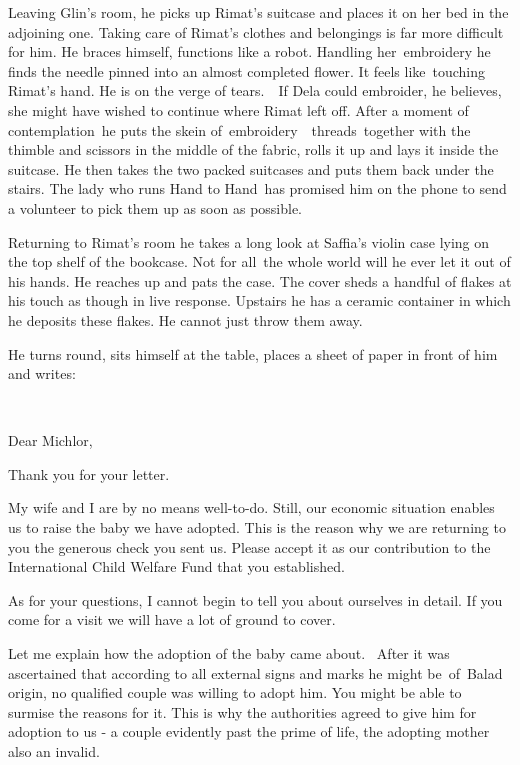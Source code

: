\documentclass[letterpaper]{article}
\begin{document}
Leaving Glin's room, he picks up Rimat's suitcase and places it on her bed in the adjoining one. Taking care of Rimat's
clothes and belongings is far more difficult for him. He braces himself, functions like a robot. Handling
her\ embroidery he finds the needle pinned into an almost completed flower. It feels like~touching Rimat's hand. He is
on the verge of tears\textcolor[rgb]{0.0,0.4392157,0.7529412}{.}\ \ If Dela could embroider, he believes, she might
have wished to continue where Rimat left off. After a moment of contemplation\ he puts the skein
of\ embroidery\ \ threads\ together with the thimble and scissors in the middle of the fabric, rolls it up and lays it
inside the suitcase. He then takes the two packed suitcases and puts them back under the stairs. The lady who runs
{\textquotedbl}Hand to Hand{\textquotedbl}~has promised him on the phone to send a volunteer to pick them up as soon as
possible. 

Returning to Rimat's room he takes a long look at Saffia's violin case lying on the top shelf of the bookcase. Not for
all\textcolor[rgb]{0.0,0.4392157,0.7529412}{\ }the whole world will he ever let it out of his hands. He reaches up and
pats the case. The cover sheds a handful of flakes at his touch as though in live response. Upstairs he has a ceramic
container in which he deposits these flakes. He cannot just throw them away.

He turns round, sits himself at the table, places a sheet of paper in front of him and writes:

~

Dear Michlor,

Thank you for your letter. 

My wife and I are by no means well-to-do. Still, our economic situation enables us to raise the baby we have adopted.
This is the reason why we are returning to you the generous check you sent us. Please accept it as our contribution to
the International Child Welfare Fund that you established.

As for your questions, I cannot begin to tell you about ourselves in detail. If you come for a visit we will have a lot
of ground to cover.

Let me explain how the adoption of the baby came about. \ After it was ascertained that according to all external signs
and marks he might be~of~Balad origin, no qualified couple was willing to adopt him. You might be able to surmise the
reasons for it. This is why the authorities agreed to give him for adoption to us - a couple evidently past the prime
of life, the adopting mother also an invalid.\ 
\end{document}
